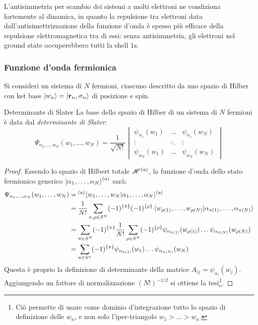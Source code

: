 L'antisimmetria per scambio dei sistemi a molti elettroni ne condiziona fortemente al dinamica, in quanto la repulsione tra elettroni data dall'antisimettrizzazione della funzione d'onda è spesso più efficace della repulsione elettromagnetica tra di essi: senza antisimmetria, gli elettroni nel ground state occuperebbero tutti la shell $ \text{1s} $.

\subsubsection{Funzione d'onda fermionica}

Si consideri un sistema di $ N $ fermioni, ciascuno descritto da uno spazio di Hilber con ket base $ \ket{w_n} = \ket{\mathbf{r}_n , \sigma_n} $ di posizione e spin.

\begin{theorem}{Determinante di Slater}{}
	La base dello spazio di Hilber di un sistema di $ N $ fermioni è data dal \textit{determinante di Slater}:
	\begin{equation}
		\Psi_{\alpha_1 , \dots , \alpha_N}(w_1 , \dots , w_N) = \frac{1}{\sqrt{N!}}
		\begin{vmatrix}
			\psi_{\alpha_1}(w_1) & \dots & \psi_{\alpha_1}(w_N) \\
			\vdots & \ddots & \vdots \\
			\psi_{\alpha_N}(w_1) & \dots & \psi_{\alpha_N}(w_N)
		\end{vmatrix}
	\end{equation}

	\tcblower

	\begin{proof}
		Essendo lo spazio di Hilbert totale $ \mathscr{H}^\text{(a)} $, la funzione d'onda dello stato fermionico generico $ \ket{\alpha_1 , \dots , \alpha_N}^\text{(a)} $ sarà:
		\begin{equation*}
			\begin{split}
				\Psi_{\alpha_1 , \dots , \alpha_N}(w_1 , \dots , w_N)
				& = {^\text{(a)}\langle}w_1 , \dots , w_N | \alpha_1 , \dots , \alpha_N{\rangle^\text{(a)}} \\
				& = \frac{1}{N!} \sum_{\pi,\rho \in S^N} (-1)^{\{\pi\}} (-1)^{\{\rho\}} \braket{w_{\rho(1)} , \dots , w_{\rho(N)} | \alpha_{\pi(1)} , \dots , \alpha_{\pi(N)}} \\
				& = \sum_{\pi \in S^N} (-1)^{\{\pi\}} \frac{1}{N!} \sum_{\rho \in S^N} (-1)^{\{\rho\}} \psi_{\alpha_{\pi(1)}}(w_{\rho(1)}) \dots \psi_{\alpha_{\pi(N)}}(w_{\rho(N)}) \\
				& = \sum_{\pi \in S^n} (-1)^{\{\pi\}} \psi_{\alpha_{\pi(1)}}(w_1) \dots \psi_{\alpha_{\pi(N)}}(w_N)
			\end{split}
		\end{equation*}
		Questa è proprio la definizione di determinante della matrice $ A_{ij} = \psi_{\alpha_i}(w_j) $. Aggiungendo un fattore di normalizzazione $ (N!)^{-1/2} $ si ottiene la tesi\footnote{Ciò permette di usare come dominio d'integrazione tutto lo spazio di definizione delle $ w_n $, e non solo l'iper-triangolo $ w_1 > \dots > w_n $.}.
	\end{proof}
\end{theorem}

